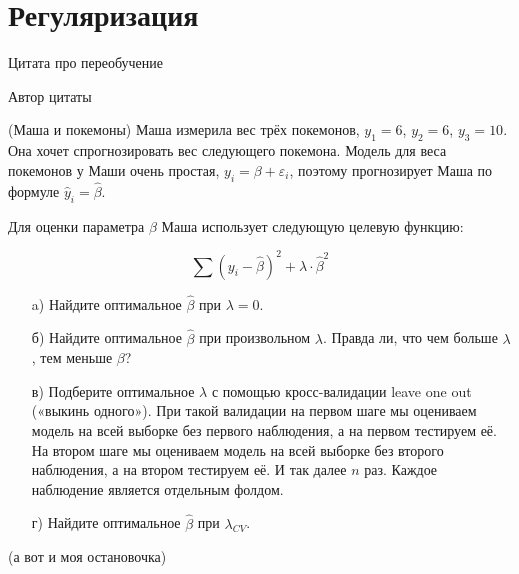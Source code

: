 
\section{Регуляризация}

\epigraph{Цитата про переобучение}{Автор цитаты}


\begin{problem}{(Маша и покемоны)}
 Маша измерила вес трёх покемонов,  $y_1=6$, $y_2=6$, $y_3=10$.  Она хочет спрогнозировать вес следующего покемона. Модель для веса покемонов у Маши очень простая, $y_i = \beta + \varepsilon_i$, поэтому прогнозирует Маша по формуле $\hat y_i = \hat \beta$.
	
	Для оценки параметра $\beta$ Маша использует следующую целевую функцию:
	
	$$
	\sum (y_i - \hat \beta)^2 + \lambda \cdot \hat \beta^2
	$$
	
	\begin{enumerate}
		\item[a)] Найдите оптимальное $\hat \beta$ при $\lambda =0$.
		\item[б)] Найдите оптимальное $\hat \beta$ при произвольном $\lambda$. Правда ли, что чем больше $\lambda$, тем меньше $\beta$? 
		\item[в)] Подберите оптимальное $\lambda$ с помощью кросс-валидации leave one out («выкинь одного»). При такой валидации на первом шаге мы оцениваем модель на всей выборке без первого наблюдения, а на первом тестируем её. На втором шаге мы оцениваем модель на всей выборке без второго наблюдения, а на втором тестируем её. И так далее $n$ раз. Каждое наблюдение является отдельным фолдом.
		\item[г)] Найдите оптимальное $\hat \beta$ при $\lambda_{CV}$.
	\end{enumerate}
\end{problem}

\begin{problem}{(а вот и моя остановочка)}
\end{problem}


